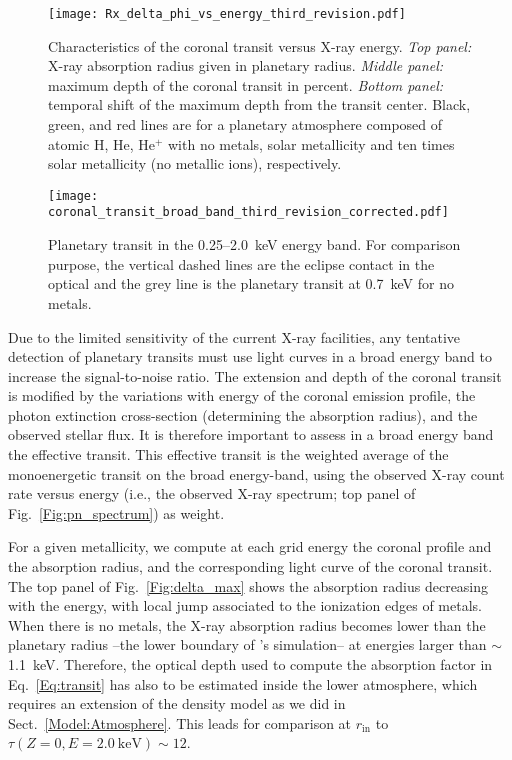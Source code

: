 \documentclass[iop]{emulateapj}
\begin{document}
\begin{figure}[!t]
  \centering
    \texttt{[image: Rx\_delta\_phi\_vs\_energy\_third\_revision.pdf]}
     \caption{Characteristics of the coronal transit versus X-ray energy. 
	      {\it Top panel:} X-ray absorption radius given in planetary radius.
	      {\it Middle panel:} maximum depth of the coronal transit in percent.
	      {\it Bottom panel:} temporal shift of the maximum depth from the 
	      transit center. Black, green, and red lines are for a planetary 
	      atmosphere composed of atomic H, He, He$^+$ with no metals, solar 
	      metallicity and ten times solar metallicity (no metallic ions), 
	      respectively.}
  \label{Fig:delta_max}
   \texttt{[image: coronal\_transit\_broad\_band\_third\_revision\_corrected.pdf]}
     \caption{Planetary transit in the 0.25--2.0~keV energy band. For 
	      comparison purpose, the vertical dashed lines are the eclipse 
	      contact in the optical and the grey line is the planetary transit 
	      at 0.7~keV for no metals.}
  \label{Fig:broad_band_transit}
\end{figure}

Due to the limited sensitivity of the current X-ray facilities, any tentative detection of planetary transits 
must use light curves in a broad energy band to increase the signal-to-noise ratio. The extension and 
depth of the coronal transit is modified by the variations with energy of the coronal emission profile, the photon
extinction cross-section (determining the absorption radius), and the observed stellar flux. It is therefore 
important to assess in a broad energy band the effective transit. This effective transit is the weighted
average of the monoenergetic transit on the broad energy-band, using the observed X-ray count rate versus 
energy (i.e., the observed X-ray spectrum; top panel of Fig.~\ref{Fig:pn_spectrum}) as weight.

For a given metallicity, we compute at each grid energy the coronal profile and the absorption radius, 
and the corresponding light curve of the coronal transit. The top panel of Fig.~\ref{Fig:delta_max} shows the 
absorption radius decreasing with the energy, with local jump associated to the ionization edges of metals.
When there is no metals, the X-ray absorption radius becomes lower than the planetary radius --the
lower boundary of \citet{Salz2016}'s simulation-- at energies larger than $\sim$1.1~keV. Therefore, the optical 
depth used to compute the absorption factor in Eq.~\ref{Eq:transit} has also to be estimated inside the lower 
atmosphere, which requires an extension of the density model as we did in Sect.~\ref{Model:Atmosphere}.
This leads for comparison at $r_\mathrm{in}$ to $\tau(Z=0,E=2.0~\mathrm{keV})\sim12$.
\end{document}
